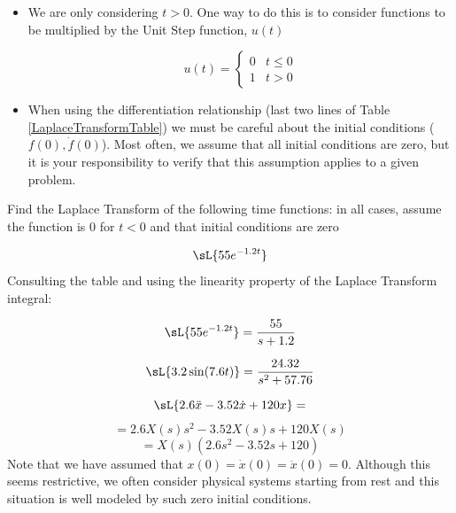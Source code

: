 \begin{itemize}
  \item We are only considering $t>0$.   One way to do this is to consider functions to be multiplied by the Unit Step function, $u(t)$

\[
  u(t) = \left \{ \begin{array}{ll}  0 & t \le 0 \\ 1 & t > 0 \end{array} \right .
\]

  \item When using the differentiation relationship (last two lines of Table \ref{LaplaceTransformTable}) we must be careful about the initial conditions ($f(0), \dot{f}(0)$).    Most often, we assume that all initial conditions are zero, but it is your responsibility to verify that this assumption applies to a given problem.
\end{itemize}



\begin{ExampleSmall}
Find the Laplace Transform of the following time functions:  in all cases, assume the function is $0$ for $t<0$ and that initial conditions are zero

\vspace{0.2in}

\[
\sL\{55e^{-1.2t}\}
\]
Consulting the table and using the linearity property of the Laplace Transform integral:

\[
\sL\{55e^{-1.2t}\} = \frac {55} {s+1.2}
\]

\vspace{0.2in}

\[
\sL\{ 3.2\sin(7.6t) \} = \frac {24.32}{s^2 + 57.76}
\]
\vspace{0.2in}


\[
\sL\{ 2.6\ddot{x} - 3.52\dot{x} + 120x \} =
\]
\[
= 2.6X(s)s^2-3.52X(s)s+120X(s)
\]
\[
= X(s) \left(2.6s^2 - 3.52s + 120 \right)
\]
Note that we have assumed that $x(0) = \dot{x}(0) = \ddot{x}(0) = 0$.   Although this seems restrictive, we often consider physical systems starting from rest and this situation is well modeled by such zero initial conditions.
\end{ExampleSmall}


